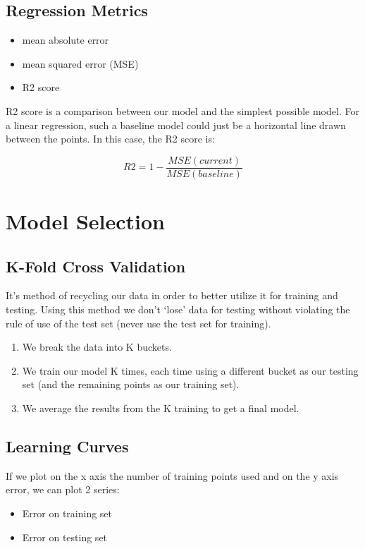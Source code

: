 \documentclass{article}
\begin{document}
\subsection{Regression Metrics}

\begin{itemize}
  \item mean absolute error
  \item mean squared error (MSE)
  \item R2 score
\end{itemize}

R2 score is a comparison between our model and the simplest possible model. For a linear regression, such a baseline model could just be a horizontal line drawn between the points. In this case, the R2 score is:

\begin{equation}
  R2 = 1 - \frac{MSE (current)}{MSE (baseline)}
\end{equation}

\section{Model Selection}
\subsection{K-Fold Cross Validation}
It’s method of recycling our data in order to better utilize it for training and testing. Using this method we don’t ‘lose’ data for testing without violating the rule of use of the test set (never use the test set for training).

\begin{enumerate}
  \item We break the data into K buckets.
  \item We train our model K times, each time using a different bucket as our testing set (and the remaining points as our training set).
  \item We average the results from the K training to get a final model.
\end{enumerate}

\subsection{Learning Curves}
If we plot on the x axis the number of training points used and on the y axis error, we can plot 2 series:

\begin{itemize}
  \item Error on training set
  \item Error on testing set
\end{itemize}
\end{document}
